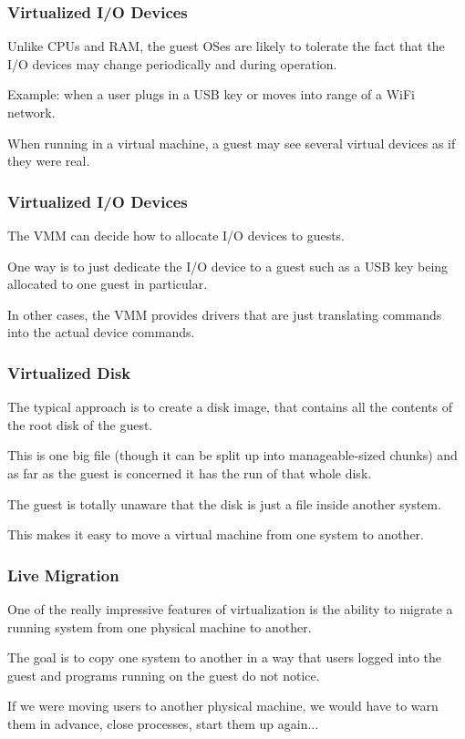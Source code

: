 \begin{frame}
\frametitle{Virtualized I/O Devices}

Unlike CPUs and RAM, the guest OSes are likely to tolerate the fact that the I/O devices may change periodically and during operation.

Example: when a user plugs in a USB key or moves into range of a WiFi network. 

When running in a virtual machine, a guest may see several virtual devices as if they were real.


\end{frame}

\begin{frame}
\frametitle{Virtualized I/O Devices}

The VMM can decide how to allocate I/O devices to guests. 

One way is to just dedicate the I/O device to a guest such as a USB key being allocated to one guest in particular. 

In other cases, the VMM provides drivers that are just translating commands into the actual device commands. 

\end{frame}

\begin{frame}
\frametitle{Virtualized Disk}

The typical approach is to create a \alert{disk image}, that contains all the contents of the root disk of the guest. 

This is one big file (though it can be split up into manageable-sized chunks) and as far as the guest is concerned it has the run of that whole disk.

The guest is totally unaware that the disk is just a file inside another system. 

This makes it easy to move a virtual machine from one system to another.
\end{frame}

\begin{frame}
\frametitle{Live Migration}

One of the really impressive features of virtualization is the ability to migrate a running system from one physical machine to another. 

The goal is to copy one system to another in a way that users logged into the guest and programs running on the guest do not notice. 

If we were moving users to another physical machine, we would have to warn them in advance, close processes, start them up again...

\end{frame}

